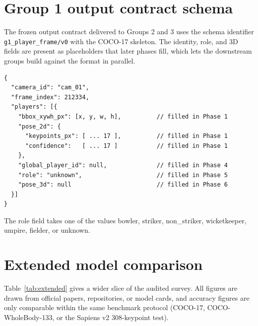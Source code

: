 \documentclass[oneside,openany]{book}
\begin{document}


\begin{appendices}

\chapter{Group 1 output contract schema}
\label{app:contract}
The frozen output contract delivered to Groups 2 and 3 uses the schema
identifier \texttt{g1\_\allowbreak player\_\allowbreak frame/\allowbreak v0} with the COCO-17
skeleton. The identity, role, and 3D fields are
present as placeholders that later phases fill, which lets the downstream groups build against
the format in parallel.

\begin{verbatim}
{
  "camera_id": "cam_01",
  "frame_index": 212334,
  "players": [{
    "bbox_xywh_px": [x, y, w, h],          // filled in Phase 1
    "pose_2d": {
      "keypoints_px": [ ... 17 ],          // filled in Phase 1
      "confidence":   [ ... 17 ]           // filled in Phase 1
    },
    "global_player_id": null,              // filled in Phase 4
    "role": "unknown",                     // filled in Phase 5
    "pose_3d": null                        // filled in Phase 6
  }]
}
\end{verbatim}

The role field takes one of the values bowler, striker, non\_striker, wicketkeeper, umpire,
fielder, or unknown.

\chapter{Extended model comparison}
\label{app:models}
Table~\ref{tab:extended} gives a wider slice of the audited survey. All figures are drawn from
official papers, repositories, or model cards, and accuracy figures are only comparable within the
same benchmark protocol (COCO-17, COCO-WholeBody-133, or the Sapiens v2 308-keypoint test).


\end{appendices}
\end{document}
